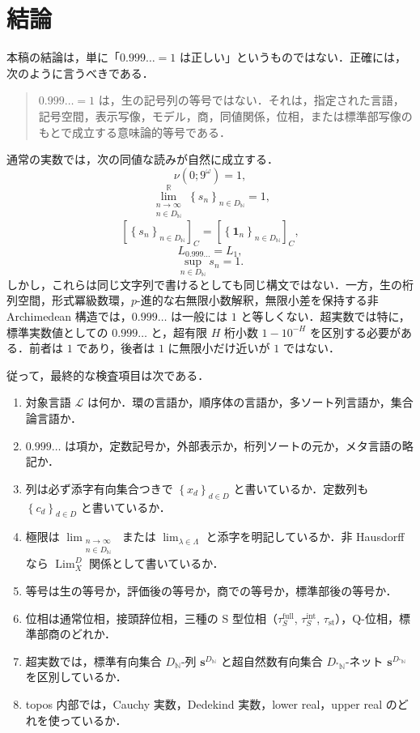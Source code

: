 \documentclass[a4paper,11pt]{ltjsarticle}
\theoremstyle{jpdef}
\theoremstyle{jpthm}
\newcommand{\N}{\mathbb{N}}
\newcommand{\R}{\mathbb{R}}
\newcommand{\Lang}{\mathcal L}
\newcommand{\Lim}{\operatorname{Lim}}
\newcommand{\DN}{D_{\N}}
\newcommand{\DStarN}{D_{{}^{\ast}\N}}
\newcommand{\seq}[2]{\left\{#1\right\}_{#2}}
\newcommand{\taufullS}{\tau^{\mathrm{full}}_{S}}
\newcommand{\tauintS}{\tau^{\mathrm{int}}_{S}}
\newcommand{\taust}{\tau_{\mathrm{st}}}
\begin{document}
\section{結論}

本稿の結論は，単に「\(0.999\ldots=1\) は正しい」というものではない．正確には，次のように言うべきである．

\begin{quote}
\(0.999\ldots=1\) は，生の記号列の等号ではない．それは，指定された言語，記号空間，表示写像，モデル，商，同値関係，位相，または標準部写像のもとで成立する意味論的等号である．
\end{quote}

通常の実数では，次の同値な読みが自然に成立する．
\[
  \nu(0;9^\omega)=1,
\]
\[
  \lim_{\substack{n\to\infty\\ n\in\DN}}^{\R}\seq{s_n}{n\in\DN}=1,
\]
\[
  [\seq{s_n}{n\in\DN}]_C=[\seq{\mathbf1_n}{n\in\DN}]_C,
\]
\[
  L_{0.999\ldots}=L_1,
\]
\[
  \sup_{n\in\DN}s_n=1.
\]
しかし，これらは同じ文字列で書けるとしても同じ構文ではない．一方，生の桁列空間，形式冪級数環，\(p\)-進的な右無限小数解釈，無限小差を保持する非 Archimedean 構造では，\(0.999\ldots\) は一般には \(1\) と等しくない．超実数では特に，標準実数値としての \(0.999\ldots\) と，超有限 \(H\) 桁小数 \(1-10^{-H}\) を区別する必要がある．前者は \(1\) であり，後者は \(1\) に無限小だけ近いが \(1\) ではない．

従って，最終的な検査項目は次である．
\begin{enumerate}
\item 対象言語 \(\Lang\) は何か．環の言語か，順序体の言語か，多ソート列言語か，集合論言語か．
\item \(0.999\ldots\) は項か，定数記号か，外部表示か，桁列ソートの元か，メタ言語の略記か．
\item 列は必ず添字有向集合つきで \(\seq{x_d}{d\in D}\) と書いているか．定数列も \(\seq{c_d}{d\in D}\) と書いているか．
\item 極限は \(\lim_{\substack{n\to\infty\\ n\in\DN}}\) または \(\lim_{\lambda\in\Lambda}\) と添字を明記しているか．非 Hausdorff なら \(\Lim_X^D\) 関係として書いているか．
\item 等号は生の等号か，評価後の等号か，商での等号か，標準部後の等号か．
\item 位相は通常位相，接頭辞位相，三種の S 型位相（\(\taufullS\), \(\tauintS\), \(\taust\)），Q-位相，標準部商のどれか．
\item 超実数では，標準有向集合 \(\DN\)-列 \(\mathbf s^{\DN}\) と超自然数有向集合 \(\DStarN\)-ネット \(\mathbf s^{\DStarN}\) を区別しているか．
\item topos 内部では，Cauchy 実数，Dedekind 実数，lower real，upper real のどれを使っているか．
\end{enumerate}
\end{document}
